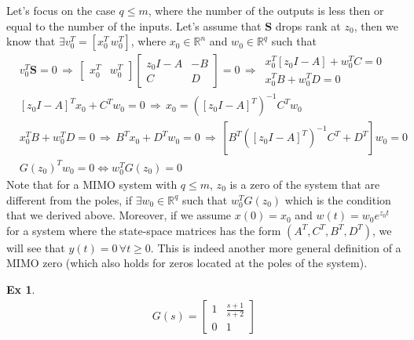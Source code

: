 \documentclass[twoside]{article}
\newtheorem{exmp}[theorem]{Ex}
\begin{document}
Let's focus on the case $q \leq m$, where the number of the outputs is less then or equal to the number of the inputs. 
Let's assume that  $\mathbf{S}$ drops rank at $z_0$, then we know that $\exists v_0^T = [x_0^T \, w_0^T]$, where $x_0 \in \mathbb{R}^{n}$ and $w_0 \in \mathbb{R}^q$ such that 
%
\begin{align*}
&v_0 ^T \mathbf{S} = 0
\, \Rightarrow \,
\left[ \begin{array}{cc} x_0^T & w_0^T \end{array} \right] \left[ \begin{array}{cc} z_0 I - A & -B \\ C & D \end{array} \right] = 0
\, \Rightarrow \,
 \begin{array}{cc} x_0^T \left[ z_0 I - A \right] + w_0^T C = 0 \\ x_0^T B + w_0^T D = 0 \end{array}
 \\
 &\left[ z_0 I - A \right]^T x_0 + C^T w_0 = 0 \, \Rightarrow \, x_0 =  \left( \left[ z_0 I - A \right]^T \right)^{-1} C^T w_0
\\
&x_0^T B + w_0^T D = 0 \, \Rightarrow \, B^T x_0 + D^T w_0 = 0  \, \Rightarrow \, 
\left[ B^T \left( \left[ z_0 I - A \right]^T \right)^{-1} C^T + D^T \right] w_0 = 0
\\
&G(z_0)^T w_0 =  0 \iff w_0^T G(z_0) = 0
\end{align*}
%
Note that for a MIMO system with $q \leq m$, $z_0$ is a zero of the system that are different from the poles, 
if $\exists w_0 \in \mathbb{R}^q$ such that $w_0^T G(z_0) $ which is the condition that we derived above. Moreover, if we 
assume $x(0) = x_0$ and $w(t) = w_0 e^{z_0 t}$ for a system where the state-space matrices has the form $(A^T,C^T,B^T,D^T)$, we will see that $y(t) = 0 \, \forall t \geq 0$. This is indeed another more general definition of a MIMO zero (which also holds for zeros located at the poles of the system).

\begin{exmp}
	\begin{align*}
	G(s) = \left[ \begin{array}{ccc} 1 & \frac{s+1}{s+2}  \\  
	0 & 1  \end{array} \right]
	\end{align*}
\end{exmp}
\end{document}
